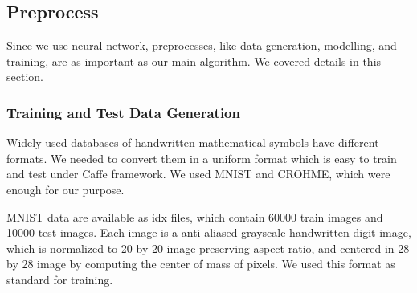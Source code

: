 \documentclass[10pt,twocolumn,letterpaper]{article}
\begin{document}
%
%
%
%
%
%


\subsection{Preprocess}

Since we use neural network, preprocesses, like data generation, modelling, and training, are as important as our main algorithm. We covered details in this section.

\subsubsection{Training and Test Data Generation}

Widely used databases of handwritten mathematical symbols have different formats. We needed to convert them in a uniform format which is easy to train and test under Caffe framework. We used MNIST and CROHME, which were enough for our purpose.

MNIST data are available as idx files, which contain 60000 train images and 10000 test images. Each image is a anti-aliased grayscale handwritten digit image, which is normalized to 20 by 20 image preserving aspect ratio, and centered in 28 by 28 image by computing the center of mass of pixels. We used this format as standard for training.
\end{document}
